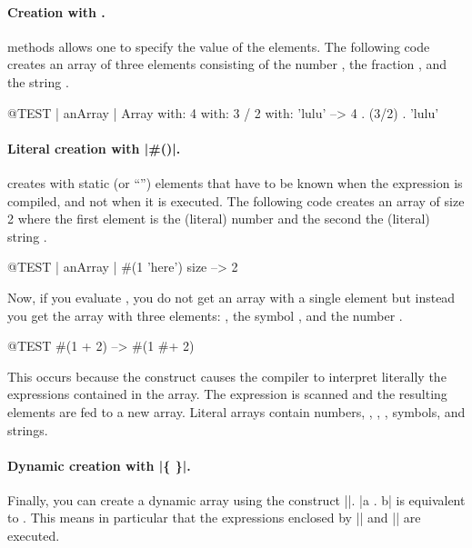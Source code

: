 \documentclass[a4paper,10pt,twoside]{book}
\begin{document}
\paragraph{Creation with .}  methods allows one to specify the value of the elements.
The following code creates an array of three elements consisting of the number , the fraction , and the string .

\begin{code}{@TEST | anArray |}
Array with: 4 with: 3 / 2 with: 'lulu' -->  {4 . (3/2) . 'lulu'}
\end{code}

\paragraph{Literal creation with \ct|\#()|.}
\ct{#()} creates  with static (or ``'') elements that have to be known when the expression is compiled, and not when it is executed.
The following code creates an array of size 2 where the first element is the (literal) number  and the second the (literal) string .


\begin{code}{@TEST | anArray |}
#(1 'here') size --> 2
\end{code}

Now, if you evaluate , you do not get an array with a single element  but instead you get the array  \ie with three elements: , the symbol \ct{#+}, and the number .

\begin{code}{@TEST}
#(1 + 2) -->  #(1 #+ 2)
\end{code}

\noindent
This occurs because the construct \ct{#()} causes the compiler to interpret literally the expressions contained in the array.
The expression is scanned and the resulting elements are fed to a new array.
Literal arrays contain numbers, , , , symbols, and strings.

\paragraph{Dynamic creation with \ct|\{ \}|.}
Finally, you can create a dynamic array using the construct \ct|{}|.
\ct|{a . b}| is equivalent to .
This means in particular that the expressions enclosed by \ct|{| and \ct|}| are executed.
\end{document}
